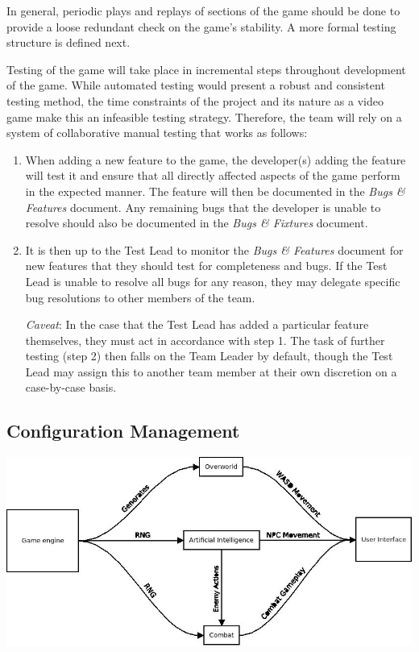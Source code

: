 \documentclass[12pt,titlepage]{article}
\begin{document}
In general, periodic plays and replays of sections of the game should be done to
provide a loose redundant check on the game's stability. A more formal testing
structure is defined next.

Testing of the game will take place in incremental steps throughout development
of the game. While automated testing would present a robust and consistent
testing method, the time constraints of the project and its nature as a video
game make this an infeasible testing strategy. Therefore, the team will rely on
a system of collaborative manual testing that works as follows:

\begin{enumerate}
    \item When adding a new feature to the game, the developer(s) adding the
        feature will test it and ensure that all directly affected aspects of
        the game perform in the expected manner. The feature will then be
        documented in the {\it Bugs \& Features} document. Any remaining bugs
        that the developer is unable to resolve should also be documented in the
        {\it Bugs \& Fixtures} document.
    \item It is then up to the Test Lead to monitor the {\it Bugs \& Features}
        document for new features that they should test for completeness and
        bugs.  If the Test Lead is unable to resolve all bugs for any reason,
        they may delegate specific bug resolutions to other members of the team.

        {\it Caveat}: In the case that the Test Lead has added a particular
        feature themselves, they must act in accordance with step 1. The task of
        further testing (step 2) then falls on the Team Leader by default,
        though the Test Lead may assign this to another team member at their own
        discretion on a case-by-case basis.
\end{enumerate}

\subsection{Configuration Management}
\includegraphics[width=16cm]{config-management}
\end{document}
